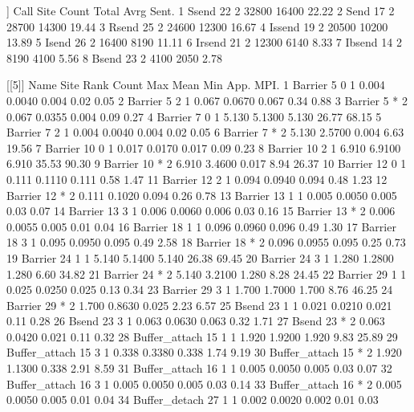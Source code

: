 \begin{Output}
[[4]]
    Call Site Count Total  Avrg Sent.
1  Ssend   22     2 32800 16400 22.22
2   Send   17     2 28700 14300 19.44
3  Rsend   25     2 24600 12300 16.67
4 Issend   19     2 20500 10200 13.89
5  Isend   26     2 16400  8190 11.11
6 Irsend   21     2 12300  6140  8.33
7 Ibsend   14     2  8190  4100  5.56
8  Bsend   23     2  4100  2050  2.78

[[5]]
            Name Site Rank Count   Max   Mean   Min  App.  MPI.
1        Barrier    5    0     1 0.004 0.0040 0.004  0.02  0.05
2        Barrier    5    2     1 0.067 0.0670 0.067  0.34  0.88
3        Barrier    5    *     2 0.067 0.0355 0.004  0.09  0.27
4        Barrier    7    0     1 5.130 5.1300 5.130 26.77 68.15
5        Barrier    7    2     1 0.004 0.0040 0.004  0.02  0.05
6        Barrier    7    *     2 5.130 2.5700 0.004  6.63 19.56
7        Barrier   10    0     1 0.017 0.0170 0.017  0.09  0.23
8        Barrier   10    2     1 6.910 6.9100 6.910 35.53 90.30
9        Barrier   10    *     2 6.910 3.4600 0.017  8.94 26.37
10       Barrier   12    0     1 0.111 0.1110 0.111  0.58  1.47
11       Barrier   12    2     1 0.094 0.0940 0.094  0.48  1.23
12       Barrier   12    *     2 0.111 0.1020 0.094  0.26  0.78
13       Barrier   13    1     1 0.005 0.0050 0.005  0.03  0.07
14       Barrier   13    3     1 0.006 0.0060 0.006  0.03  0.16
15       Barrier   13    *     2 0.006 0.0055 0.005  0.01  0.04
16       Barrier   18    1     1 0.096 0.0960 0.096  0.49  1.30
17       Barrier   18    3     1 0.095 0.0950 0.095  0.49  2.58
18       Barrier   18    *     2 0.096 0.0955 0.095  0.25  0.73
19       Barrier   24    1     1 5.140 5.1400 5.140 26.38 69.45
20       Barrier   24    3     1 1.280 1.2800 1.280  6.60 34.82
21       Barrier   24    *     2 5.140 3.2100 1.280  8.28 24.45
22       Barrier   29    1     1 0.025 0.0250 0.025  0.13  0.34
23       Barrier   29    3     1 1.700 1.7000 1.700  8.76 46.25
24       Barrier   29    *     2 1.700 0.8630 0.025  2.23  6.57
25         Bsend   23    1     1 0.021 0.0210 0.021  0.11  0.28
26         Bsend   23    3     1 0.063 0.0630 0.063  0.32  1.71
27         Bsend   23    *     2 0.063 0.0420 0.021  0.11  0.32
28 Buffer_attach   15    1     1 1.920 1.9200 1.920  9.83 25.89
29 Buffer_attach   15    3     1 0.338 0.3380 0.338  1.74  9.19
30 Buffer_attach   15    *     2 1.920 1.1300 0.338  2.91  8.59
31 Buffer_attach   16    1     1 0.005 0.0050 0.005  0.03  0.07
32 Buffer_attach   16    3     1 0.005 0.0050 0.005  0.03  0.14
33 Buffer_attach   16    *     2 0.005 0.0050 0.005  0.01  0.04
34 Buffer_detach   27    1     1 0.002 0.0020 0.002  0.01  0.03

\end{Output}
